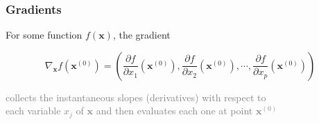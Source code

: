 \documentclass[xcolor={dvipsnames}]{beamer}
\begin{document}
\frame
{
\frametitle{Gradients}

For some function $f({\boldsymbol x})$, the gradient

$$\nabla_{\boldsymbol x} f\left({\boldsymbol x^{(0)}}\right) = \left(\frac{\partial f}{\partial x_1}\left({\boldsymbol x^{(0)}}\right), \frac{\partial f}{\partial x_2}\left({\boldsymbol x^{(0)}}\right), \cdots, \frac{\partial f}{\partial x_p}\left({\boldsymbol x^{(0)}}\right) \right)$$

\textcolor{gray}{collects the instantaneous slopes (derivatives) with respect to\\
each variable $x_j$ of ${\boldsymbol x}$ and then evaluates each one at point ${\boldsymbol x^{(0)}}$}\\${}$\\



\vspace{.5em}


\begin{figure}
\centering
{}
\end{figure}

}
\end{document}
